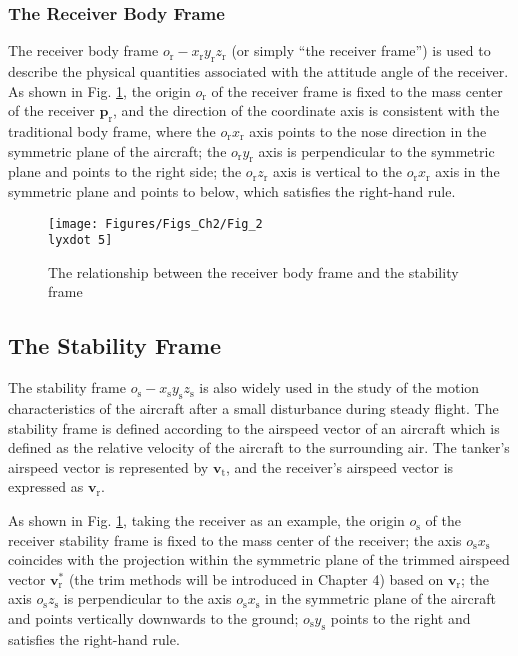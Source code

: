 \subsubsection{The Receiver Body Frame}

The receiver body frame ${{o}_{\text{r}}}-{{x}_{\text{r}}}{{y}_{\text{r}}}{{z}_{\text{r}}}$
(or simply \textquotedblleft the receiver frame\textquotedblright )
is used to describe the physical quantities associated with the attitude
angle of the receiver. As shown in Fig. \ref{Fig_2.5}, the origin
${{o}_{\text{r}}}$ of the receiver frame is fixed to the mass center
of the receiver ${{\mathbf{p}}_{\text{r}}}$, and the direction of
the coordinate axis is consistent with the traditional body frame,
where the ${{o}_{\text{r}}}{{x}_{\text{r}}}$ axis points to the nose
direction in the symmetric plane of the aircraft; the ${{o}_{\text{r}}}{{y}_{\text{r}}}$
axis is perpendicular to the symmetric plane and points to the right
side; the ${{o}_{\text{r}}}{{z}_{\text{r}}}$ axis is vertical to
the ${{o}_{\text{r}}}{{x}_{\text{r}}}$ axis in the symmetric plane
and points to below, which satisfies the right-hand rule.

\begin{figure}
	\begin{centering}
		\texttt{[image: Figures/Figs\_Ch2/Fig\_2\\lyxdot 5]}
		\par\end{centering}
	\caption{The relationship between the receiver body frame and the stability frame}
	
	\centering{}\label{Fig_2.5}
\end{figure}


\subsection{The Stability Frame}

The stability frame ${{o}_{\text{s}}}-{{x}_{\text{s}}}{{y}_{\text{s}}}{{z}_{\text{s}}}$
is also widely used in the study of the motion characteristics of
the aircraft after a small disturbance during steady flight. The stability
frame is defined according to the airspeed vector of an aircraft which
is defined as the relative velocity of the aircraft to the surrounding
air. The tanker's airspeed vector is represented by ${{\mathbf{v}}_{\text{t}}}$,
and the receiver's airspeed vector is expressed as ${{\mathbf{v}}_{\text{r}}}$.

As shown in Fig. \ref{Fig_2.5}, taking the receiver as an example,
the origin ${{o}_{\text{s}}}$ of the receiver stability frame is
fixed to the mass center of the receiver; the axis ${{o}_{\text{s}}}{{x}_{\text{s}}}$
coincides with the projection within the symmetric plane of the trimmed
airspeed vector $\mathbf{v}_{\text{r}}^{*}$ (the trim methods will
be introduced in Chapter 4) based on ${{\mathbf{v}}_{\text{r}}}$;
the axis ${{o}_{\text{s}}}{{z}_{\text{s}}}$ is perpendicular to the
axis ${{o}_{\text{s}}}{{x}_{\text{s}}}$ in the symmetric plane of
the aircraft and points vertically downwards to the ground; ${{o}_{\text{s}}}{{y}_{\text{s}}}$
points to the right and satisfies the right-hand rule.

